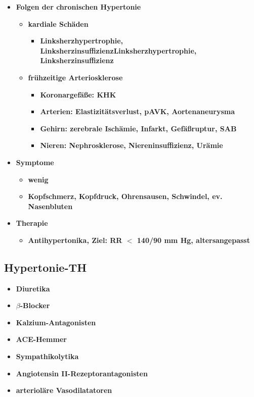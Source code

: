 \begin{itemize}
\begin{itemize}
					\item \textbf{Folgen der chronischen Hypertonie}
						\begin{itemize}
							\item \textbf{kardiale Schäden}
								\begin{itemize}
									\item \textbf{Linksherzhypertrophie, LinksherzinsuffizienzLinksherzhypertrophie, Linksherzinsuffizienz}
								\end{itemize}
							\item \textbf{frühzeitige Arteriosklerose}
								\begin{itemize}
									\item \textbf{Koronargefäße: KHK}
									\item \textbf{Arterien: Elastizitätsverlust, pAVK, Aortenaneurysma}
									\item \textbf{Gehirn: zerebrale Ischämie, Infarkt, Gefäßruptur, SAB}
									\item \textbf{Nieren: Nephrosklerose, Niereninsuffizienz, Urämie}
								\end{itemize}
						\end{itemize}
					\item \textbf{Symptome}
						\begin{itemize}
							\item \textbf{wenig}
							\item \textbf{Kopfschmerz, Kopfdruck, Ohrensausen, Schwindel, ev. Nasenbluten}
						\end{itemize}
					\item \textbf{Therapie}
						\begin{itemize}
							\item \textbf{Antihypertonika, Ziel: RR $<$ 140/90 mm Hg, altersangepasst}
						\end{itemize}
				\end{itemize}
		\end{itemize}
	\subsection{Hypertonie-TH}
		\begin{itemize}
			\item \textbf{Diuretika}
			\item \textbf{$\beta$-Blocker}
			\item \textbf{Kalzium-Antagonisten}
			\item \textbf{ACE-Hemmer}
			\item \textbf{Sympathikolytika}
			\item \textbf{Angiotensin II-Rezeptorantagonisten}
			\item \textbf{arterioläre Vasodilatatoren}
		\end{itemize}
